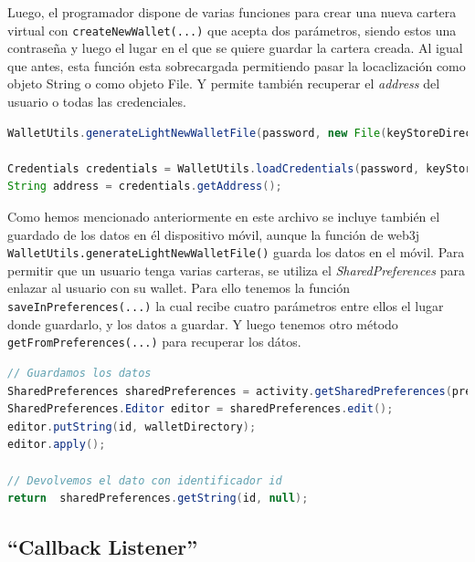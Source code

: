 Luego, el programador dispone de varias funciones para crear una nueva cartera virtual con \verb|createNewWallet(...)| que acepta dos parámetros, siendo estos una contraseña y luego el lugar en el que se quiere guardar la cartera creada. Al igual que antes, esta función esta sobrecargada permitiendo pasar la locaclización como objeto String o como objeto File. Y permite también recuperar el \emph{address} del usuario o todas las credenciales. 

\begin{lstlisting}[language=Java,float=ht,caption={[Java] Creacion de wallet y recuperación del address},label=lst:transactionHelper]
WalletUtils.generateLightNewWalletFile(password, new File(keyStoreDirectory));

Credentials credentials = WalletUtils.loadCredentials(password, keyStoreDirectory);
String address = credentials.getAddress();
\end{lstlisting}

Como hemos mencionado anteriormente en este archivo se incluye también el guardado de los datos en él dispositivo móvil, aunque la función de web3j \verb|WalletUtils.generateLightNewWalletFile()| guarda los datos en el móvil. Para permitir que un usuario tenga varias carteras, se utiliza el \emph{SharedPreferences} para enlazar al usuario con su wallet. Para ello tenemos la función \verb|saveInPreferences(...)| la cual recibe cuatro parámetros entre ellos el lugar donde guardarlo, y los datos a guardar. Y luego tenemos otro método \verb|getFromPreferences(...)| para recuperar los dátos. 

\begin{lstlisting}[language=Java,float=ht,caption={[Java] Guardado y recuperación de dátos en SharedPreferences},label=lst:transactionHelper]
// Guardamos los datos
SharedPreferences sharedPreferences = activity.getSharedPreferences(prefsName, Context.MODE_PRIVATE);
SharedPreferences.Editor editor = sharedPreferences.edit();
editor.putString(id, walletDirectory);
editor.apply();

// Devolvemos el dato con identificador id
return  sharedPreferences.getString(id, null);
\end{lstlisting}

\subsection{``Callback Listener''}

